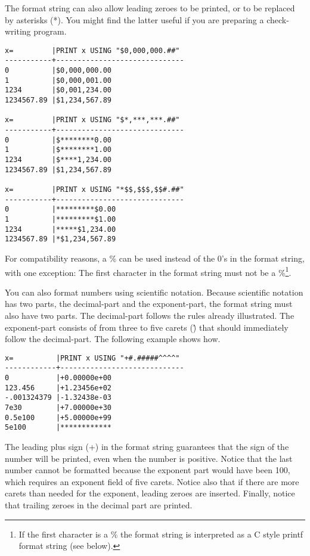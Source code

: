 The format string can also allow leading zeroes to be printed, or to be 
replaced by asterisks (*). You might find the latter useful if you are 
preparing a check-writing program.

\begin{verbatim}
x=         |PRINT x USING "$0,000,000.##"
-----------+------------------------------
0          |$0,000,000.00
1          |$0,000,001.00
1234       |$0,001,234.00
1234567.89 |$1,234,567.89

x=         |PRINT x USING "$*,***,***.##"
-----------+------------------------------
0          |$********0.00
1          |$********1.00
1234       |$****1,234.00
1234567.89 |$1,234,567.89

x=         |PRINT x USING "*$$,$$$,$$#.##"
-----------+------------------------------
0          |*********$0.00
1          |*********$1.00
1234       |*****$1,234.00
1234567.89 |*$1,234,567.89
\end{verbatim}

For compatibility reasons, a \% can be used instead of the 0's in the 
format string, with one exception: The first character in the format 
string must not be a \%\footnote{If the first character is a \% the 
format string is interpreted as a C style printf format string (see below).}. 

You can also format numbers using scientific notation. Because scientific 
notation has two parts, the decimal-part and the exponent-part, the format 
string must also have two parts. The decimal-part follows the rules already 
illustrated. The exponent-part consists of from three to five carets (\^) that 
should immediately follow the decimal-part. The following example shows how.

\begin{verbatim}
x=          |PRINT x USING "+#.#####^^^^"
------------+-----------------------------
0           |+0.00000e+00
123.456     |+1.23456e+02
-.001324379 |-1.32438e-03
7e30        |+7.00000e+30
0.5e100     |+5.00000e+99
5e100       |************
\end{verbatim}

The leading plus sign (+) in the format string guarantees that the
sign of the number will be printed, even when the number is positive. Notice
that the last number cannot be formatted because the exponent part would
have been 100, which requires an exponent field of five carets. Notice also that
if there are more carets than needed for the exponent, leading zeroes are
inserted. Finally, notice that trailing zeroes in the decimal part are printed.

